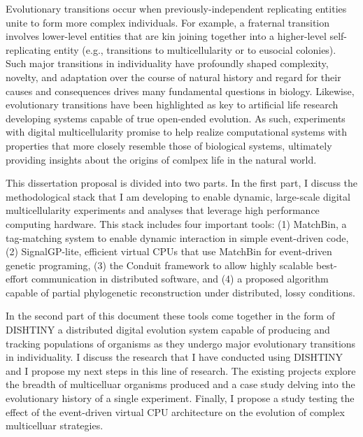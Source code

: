 Evolutionary transitions occur when previously-independent replicating entities unite to form more complex individuals.
For example, a fraternal transition involves lower-level entities that are kin joining together into a higher-level self-replicating entity (e.g., transitions to multicellularity or to eusocial colonies).
Such major transitions in individuality have profoundly shaped complexity, novelty, and adaptation over the course of natural history and regard for their causes and consequences drives many fundamental questions in biology.
Likewise, evolutionary transitions have been highlighted as key to artificial life research developing systems capable of true open-ended evolution.
As such, experiments with digital multicellularity promise to help realize computational systems with properties that more closely resemble those of biological systems, ultimately providing insights about the origins of comlpex life in the natural world.

This dissertation proposal is divided into two parts.
In the first part, I discuss the methodological stack that I am developing to enable dynamic, large-scale digital multicellularity experiments and analyses that leverage high performance computing hardware.
This stack includes four important tools:
(1) MatchBin, a tag-matching system to enable dynamic interaction in simple event-driven code,
(2) SignalGP-lite, efficient virtual CPUs that use MatchBin for event-driven genetic programing,
(3) the Conduit framework to allow highly scalable best-effort communication in distributed software, and
(4) a proposed algorithm capable of partial phylogenetic reconstruction under distributed, lossy conditions.

In the second part of this document these tools come together in the form of DISHTINY a distributed digital evolution system capable of producing and tracking populations of organisms as they undergo major evolutionary transitions in individuality.
I discuss the research that I have conducted using DISHTINY and I propose my next steps in this line of research.
The existing projects explore the breadth of multicelluar organisms produced and a case study delving into the evolutionary history of a single experiment.
Finally, I propose a study testing the effect of the event-driven virtual CPU architecture on the evolution of complex multicelluar strategies.
